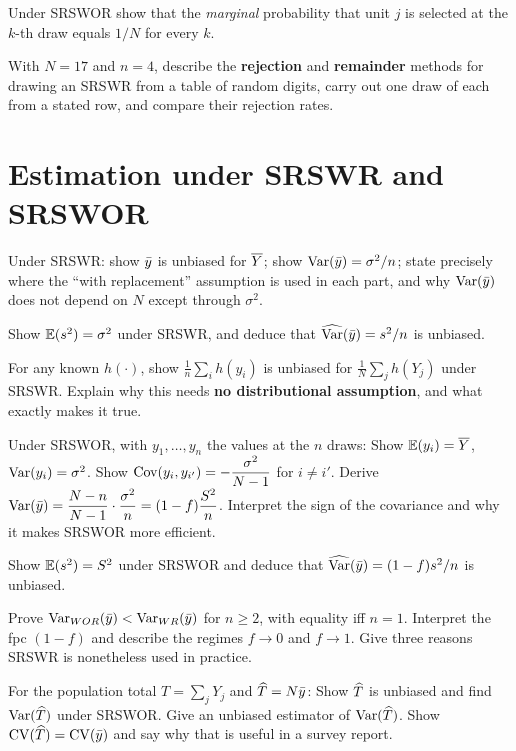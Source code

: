 Under SRSWOR show that the \emph{marginal} probability that unit $j$ is selected at the $k$-th
draw equals $1/N$ for every $k$. 

With $N=17$ and $n=4$, describe the \textbf{rejection} and \textbf{remainder} methods for drawing
an SRSWR from a table of random digits, carry out one draw of each from a stated row, and compare
their rejection rates.

\section{Estimation under SRSWR and SRSWOR}

Under SRSWR:  show $\bar{y}$ is unbiased for $\overline{Y}$;  show $\operatorname{Var}(\bar{y})=\sigma^2/n$;
 state precisely where the ``with replacement'' assumption is used in each part, and why
$\operatorname{Var}(\bar{y})$ does not depend on $N$ except through $\sigma^2$.

Show $\mathbb{E}(s^2)=\sigma^2$ under SRSWR, and deduce that $\widehat{\operatorname{Var}}(\bar{y})=s^2/n$ is unbiased.

For any known $h(\cdot)$, show $\frac1n\sum_ih(y_i)$ is unbiased for $\frac1N\sum_jh(Y_j)$ under
SRSWR. Explain why this needs \textbf{no distributional assumption}, and what exactly makes it
true.

Under SRSWOR, with $y_1,\dots,y_n$ the values at the $n$ draws:
 Show $\mathbb{E}(y_i)=\overline{Y}$, $\operatorname{Var}(y_i)=\sigma^2$.
 Show $\operatorname{Cov}(y_i,y_{i'})=-\dfrac{\sigma^2}{N-1}$ for $i\ne i'$.
 Derive $\operatorname{Var}(\bar{y})=\dfrac{N-n}{N-1}\cdot\dfrac{\sigma^2}{n}=(1-f)\dfrac{S^2}{n}$.
 Interpret the sign of the covariance and why it makes SRSWOR more efficient.

Show $\mathbb{E}(s^2)=S^2$ under SRSWOR and deduce that $\widehat{\operatorname{Var}}(\bar{y})=(1-f)s^2/n$ is unbiased.

 Prove $\operatorname{Var}_{WOR}(\bar{y})<\operatorname{Var}_{WR}(\bar{y})$ for $n\ge2$, with equality iff $n=1$.
 Interpret the fpc $(1-f)$ and describe the regimes $f\to0$ and $f\to1$.
 Give three reasons SRSWR is nonetheless used in practice.

For the population total $T=\sum_jY_j$ and $\widehat{T}=N\bar{y}$:
 Show $\widehat{T}$ is unbiased and find $\operatorname{Var}(\widehat{T})$ under SRSWOR.
 Give an unbiased estimator of $\operatorname{Var}(\widehat{T})$.
 Show $\operatorname{CV}(\widehat{T})=\operatorname{CV}(\bar{y})$ and say why that is useful in a survey report.

